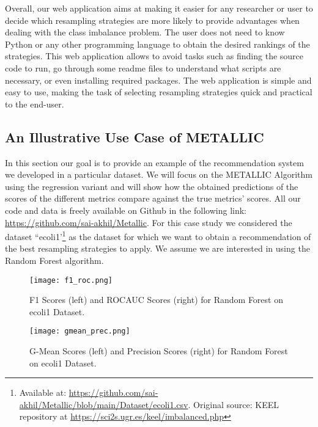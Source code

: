 \documentclass{article}
\begin{document}
Overall, our web application aims at making it easier for any researcher or user to decide which resampling strategies are more likely to provide advantages when dealing with the class imbalance problem. The user does not need to know Python or any other programming language to obtain the desired rankings of the strategies. This web application allows to avoid tasks such as finding the source code to run, go through some readme files to understand what scripts are necessary, or even installing required packages. The web application is simple and easy to use, making the task of selecting resampling strategies quick and practical to the end-user.  


\subsection{An Illustrative Use Case of METALLIC}\label{sec:res4}
In this section our goal is to provide an example of the recommendation system we developed in a particular dataset. We will focus on the METALLIC Algorithm using the regression variant and will show how the obtained predictions of the scores of the different metrics compare against the true metrics' scores. All our code and data is freely available on Github in the following link: \url{https://github.com/sai-akhil/Metallic}. For this case study we considered the dataset ``ecoli1'\footnote{Available at: \url{https://github.com/sai-akhil/Metallic/blob/main/Dataset/ecoli1.csv}. Original source: KEEL repository at \url{https://sci2s.ugr.es/keel/imbalanced.php}} as the dataset for which we want to obtain a recommendation of the best resampling strategies to apply. We assume we are interested in using the Random Forest algorithm.

\begin{figure}[!htbp]
\centering
\texttt{[image: f1\_roc.png]}
\caption{F1 Scores (left) and ROCAUC Scores (right) for Random Forest on ecoli1 Dataset.}\label{f1}
\end{figure}


\begin{figure}[!htbp]
\centering
\texttt{[image: gmean\_prec.png]}
\caption{G-Mean Scores (left) and Precision Scores (right) for Random Forest on ecoli1 Dataset.}\label{gmean}
\end{figure}
\end{document}
